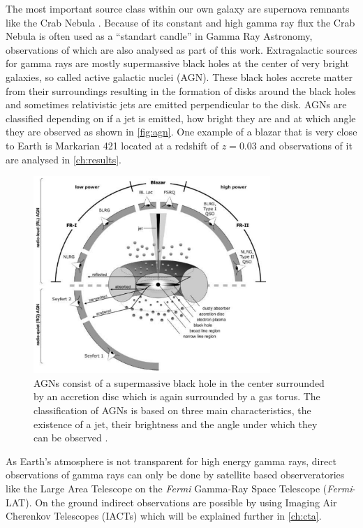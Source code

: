 The most important source class within our own galaxy are supernova remnants like the Crab Nebula \cite{nuimeprn12618}. 
Because of its constant and high gamma ray flux the Crab Nebula is often used as a \enquote{standart candle} in Gamma Ray Astronomy, observations of which are also 
analysed as part of this work.
Extragalactic sources for gamma rays are mostly supermassive black holes at the center of very bright galaxies, so called active galactic nuclei (AGN).
These black holes accrete matter from their surroundings resulting in the formation of disks around the black holes and sometimes relativistic jets are emitted 
perpendicular to the disk.
AGNs are classified depending on if a jet is emitted, how bright they are and at which angle they are observed as shown in \autoref{fig:agn}.
One example of a blazar that is very close to Earth is Markarian 421 located at a redshift of $z = \num{0.03}$ \cite{Albert_2007} and observations of it are analysed in 
\autoref{ch:results}.
\begin{figure}
    \centering
    \includegraphics[width=0.8\textwidth]{images/agn.png}
    \caption{AGNs consist of a supermassive black hole in the center surrounded by an accretion disc which is again surrounded by a gas torus.
        The classification of AGNs is based on three main characteristics, the existence of a jet, their brightness and the angle under which they can be observed \cite{doi:10.1002/9783527666829.ch4}.
    }
    \label{fig:agn}
\end{figure}


As Earth's atmosphere is not transparent for high energy gamma rays, direct observations of gamma rays can only be done by satellite based observeratories 
like the Large Area Telescope on the \textit{Fermi} Gamma-Ray Space Telescope (\textit{Fermi}-LAT).
On the ground indirect observations are possible by using Imaging Air Cherenkov Telescopes (IACTs) which will be explained further in \autoref{ch:cta}.
